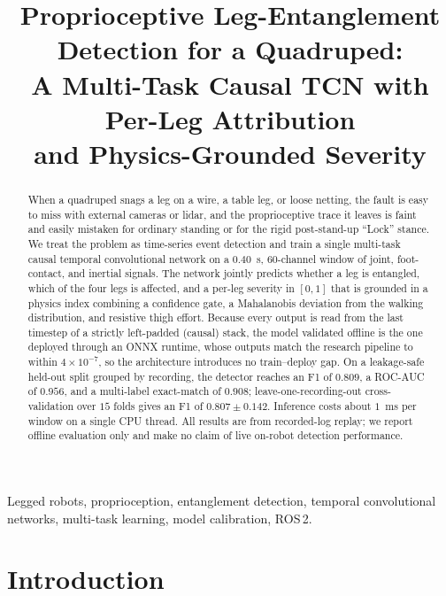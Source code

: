 \documentclass[conference]{IEEEtran}
\begin{document}
\title{Proprioceptive Leg-Entanglement Detection for a Quadruped:\\
A Multi-Task Causal TCN with Per-Leg Attribution\\ and Physics-Grounded Severity}
\author{
}
\maketitle
\begin{abstract}
When a quadruped snags a leg on a wire, a table leg, or loose netting, the fault is easy to miss with external cameras or lidar, and the proprioceptive trace it leaves is faint and easily mistaken for ordinary standing or for the rigid post-stand-up ``Lock'' stance. We treat the problem as time-series event detection and train a single multi-task causal temporal convolutional network on a $0.40$~s, $60$-channel window of joint, foot-contact, and inertial signals. The network jointly predicts whether a leg is entangled, which of the four legs is affected, and a per-leg severity in $[0,1]$ that is grounded in a physics index combining a confidence gate, a Mahalanobis deviation from the walking distribution, and resistive thigh effort. Because every output is read from the last timestep of a strictly left-padded (causal) stack, the model validated offline is the one deployed through an ONNX runtime, whose outputs match the research pipeline to within $4\times10^{-7}$, so the architecture introduces no train--deploy gap. On a leakage-safe held-out split grouped by recording, the detector reaches an F1 of $0.809$, a ROC-AUC of $0.956$, and a multi-label exact-match of $0.908$; leave-one-recording-out cross-validation over $15$ folds gives an F1 of $0.807 \pm 0.142$. Inference costs about $1$~ms per window on a single CPU thread. All results are from recorded-log replay; we report offline evaluation only and make no claim of live on-robot detection performance.
\end{abstract}
\begin{IEEEkeywords}
Legged robots, proprioception, entanglement detection, temporal convolutional networks,
multi-task learning, model calibration, ROS\,2.
\end{IEEEkeywords}

\section{Introduction}
\end{document}
